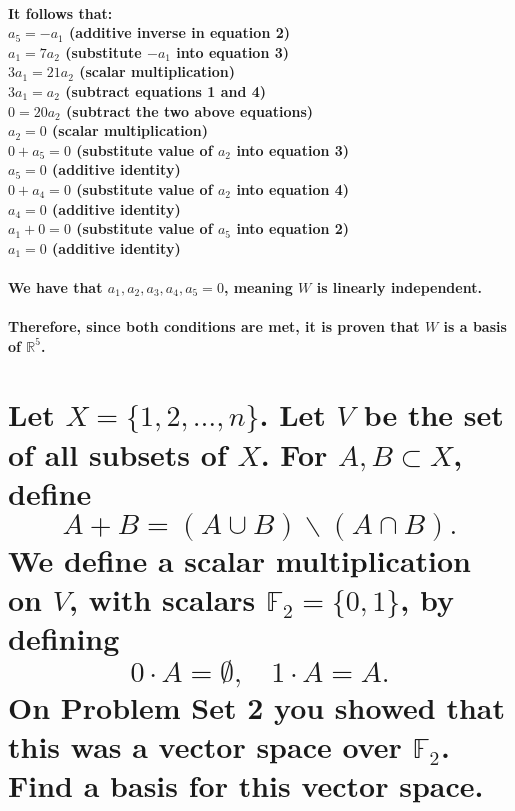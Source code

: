 \documentclass{article}
\begin{document}
\paragraph{\large
It follows that:
\\\indent $a_5 = -a_1$ (additive inverse in equation 2)
\\\indent $a_1 = 7a_2$ (substitute $-a_1$ into equation 3)
\\\indent $3a_1 = 21a_2$ (scalar multiplication)
\\\indent $3a_1 = a_2$ (subtract equations 1 and 4)
\\\indent $0 = 20a_2$ (subtract the two above equations)
\\\indent $a_2 = 0$ (scalar multiplication)
\\\indent $0 + a_5 = 0$ (substitute value of $a_2$ into equation 3)
\\\indent $a_5 = 0$ (additive identity)
\\\indent $0 + a_4 = 0$ (substitute value of $a_2$ into equation 4)
\\\indent $a_4 = 0$ (additive identity)
\\\indent $a_1 + 0 = 0$ (substitute value of $a_5$ into equation 2)
\\\indent $a_1 = 0$ (additive identity)}

\paragraph{\large
We have that $a_1,a_2,a_3,a_4,a_5 = 0$, meaning $W$ is linearly independent.}

\paragraph{\large
Therefore, since both conditions are met, it is proven that $W$ is a basis of $\mathbb{R}^5$.}

\newpage

\section{Let $X = \{1,2,\ldots,n\}$. Let $V$ be the set of all subsets of $X$. For $A,B \subset X$, define 
$$
A + B = (A \cup B) \backslash (A \cap B).
$$
We define a scalar multiplication on $V$, with scalars $\mathbb{F}_2 = \{0,1\}$, by defining
$$
0 \cdot A = \emptyset,\ \ \ \ 1 \cdot A = A.
$$
On Problem Set 2 you showed that this was a vector space over $\mathbb{F}_2$. Find a basis for this vector space.}
\end{document}
